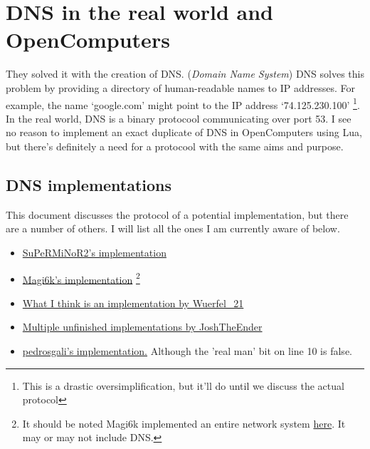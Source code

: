 \documentclass[]{report}
\begin{document}
\section{DNS in the real world and OpenComputers}
 They solved it with the creation of DNS. (\textit{Domain Name System}) DNS solves this problem by providing a directory of human-readable names to IP addresses. For example, the name `google.com' might point to the IP address `74.125.230.100' \footnote{This is a drastic oversimplification, but it'll do until we discuss the actual protocol}. In the real world, DNS is a binary protocool communicating over port 53. I see no reason to implement an exact duplicate of DNS in OpenComputers using Lua, but there's definitely a need for a protocool with the same aims and purpose. 
\subsection{DNS implementations}
 This document discusses the protocol of a potential implementation, but there are a number of others. I will list all the ones I am currently aware of below.
\begin{itemize}
	\item \href{https://github.com/OpenPrograms/SuPeRMiNoR2-Programs/blob/master/networking/dns.lua}{SuPeRMiNoR2's implementation}
	\item
	\href{http://oc.cil.li/index.php?/topic/215-dns-system/}{Magi6k's implementation} \footnote{It should be noted Magi6k implemented an entire network system \href{https://github.com/OpenPrograms/Magik6k-Programs/tree/master/network}{here}. It may or may not include DNS.}
	\item
	\href{https://github.com/OpenPrograms/Wuerfel_21-OC-Toolkit/tree/master/snl}{What I think is an implementation by Wuerfel\_21}
	\item
	\href{https://github.com/OpenPrograms/JoshTheEnder-Programs}{Multiple unfinished implementations by JoshTheEnder}
	\item
	\href{http://pastebin.com/pxFY89UZ}{pedrosgali's implementation.} Although the 'real man' bit on line 10 is false.
\end{itemize}
\end{document}
